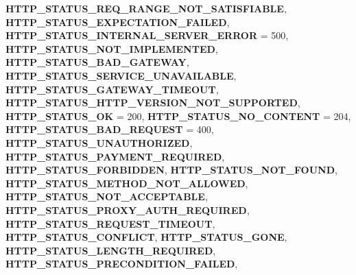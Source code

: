 \begin{DoxyCompactItemize}
\newline
{\bfseries H\+T\+T\+P\+\_\+\+S\+T\+A\+T\+U\+S\+\_\+\+R\+E\+Q\+\_\+\+R\+A\+N\+G\+E\+\_\+\+N\+O\+T\+\_\+\+S\+A\+T\+I\+S\+F\+I\+A\+B\+LE}, 
{\bfseries H\+T\+T\+P\+\_\+\+S\+T\+A\+T\+U\+S\+\_\+\+E\+X\+P\+E\+C\+T\+A\+T\+I\+O\+N\+\_\+\+F\+A\+I\+L\+ED}, 
{\bfseries H\+T\+T\+P\+\_\+\+S\+T\+A\+T\+U\+S\+\_\+\+I\+N\+T\+E\+R\+N\+A\+L\+\_\+\+S\+E\+R\+V\+E\+R\+\_\+\+E\+R\+R\+OR} = 500, 
{\bfseries H\+T\+T\+P\+\_\+\+S\+T\+A\+T\+U\+S\+\_\+\+N\+O\+T\+\_\+\+I\+M\+P\+L\+E\+M\+E\+N\+T\+ED}, 
\newline
{\bfseries H\+T\+T\+P\+\_\+\+S\+T\+A\+T\+U\+S\+\_\+\+B\+A\+D\+\_\+\+G\+A\+T\+E\+W\+AY}, 
{\bfseries H\+T\+T\+P\+\_\+\+S\+T\+A\+T\+U\+S\+\_\+\+S\+E\+R\+V\+I\+C\+E\+\_\+\+U\+N\+A\+V\+A\+I\+L\+A\+B\+LE}, 
{\bfseries H\+T\+T\+P\+\_\+\+S\+T\+A\+T\+U\+S\+\_\+\+G\+A\+T\+E\+W\+A\+Y\+\_\+\+T\+I\+M\+E\+O\+UT}, 
{\bfseries H\+T\+T\+P\+\_\+\+S\+T\+A\+T\+U\+S\+\_\+\+H\+T\+T\+P\+\_\+\+V\+E\+R\+S\+I\+O\+N\+\_\+\+N\+O\+T\+\_\+\+S\+U\+P\+P\+O\+R\+T\+ED}, 
\newline
{\bfseries H\+T\+T\+P\+\_\+\+S\+T\+A\+T\+U\+S\+\_\+\+OK} = 200, 
{\bfseries H\+T\+T\+P\+\_\+\+S\+T\+A\+T\+U\+S\+\_\+\+N\+O\+\_\+\+C\+O\+N\+T\+E\+NT} = 204, 
{\bfseries H\+T\+T\+P\+\_\+\+S\+T\+A\+T\+U\+S\+\_\+\+B\+A\+D\+\_\+\+R\+E\+Q\+U\+E\+ST} = 400, 
{\bfseries H\+T\+T\+P\+\_\+\+S\+T\+A\+T\+U\+S\+\_\+\+U\+N\+A\+U\+T\+H\+O\+R\+I\+Z\+ED}, 
\newline
{\bfseries H\+T\+T\+P\+\_\+\+S\+T\+A\+T\+U\+S\+\_\+\+P\+A\+Y\+M\+E\+N\+T\+\_\+\+R\+E\+Q\+U\+I\+R\+ED}, 
{\bfseries H\+T\+T\+P\+\_\+\+S\+T\+A\+T\+U\+S\+\_\+\+F\+O\+R\+B\+I\+D\+D\+EN}, 
{\bfseries H\+T\+T\+P\+\_\+\+S\+T\+A\+T\+U\+S\+\_\+\+N\+O\+T\+\_\+\+F\+O\+U\+ND}, 
{\bfseries H\+T\+T\+P\+\_\+\+S\+T\+A\+T\+U\+S\+\_\+\+M\+E\+T\+H\+O\+D\+\_\+\+N\+O\+T\+\_\+\+A\+L\+L\+O\+W\+ED}, 
\newline
{\bfseries H\+T\+T\+P\+\_\+\+S\+T\+A\+T\+U\+S\+\_\+\+N\+O\+T\+\_\+\+A\+C\+C\+E\+P\+T\+A\+B\+LE}, 
{\bfseries H\+T\+T\+P\+\_\+\+S\+T\+A\+T\+U\+S\+\_\+\+P\+R\+O\+X\+Y\+\_\+\+A\+U\+T\+H\+\_\+\+R\+E\+Q\+U\+I\+R\+ED}, 
{\bfseries H\+T\+T\+P\+\_\+\+S\+T\+A\+T\+U\+S\+\_\+\+R\+E\+Q\+U\+E\+S\+T\+\_\+\+T\+I\+M\+E\+O\+UT}, 
{\bfseries H\+T\+T\+P\+\_\+\+S\+T\+A\+T\+U\+S\+\_\+\+C\+O\+N\+F\+L\+I\+CT}, 
\newline
{\bfseries H\+T\+T\+P\+\_\+\+S\+T\+A\+T\+U\+S\+\_\+\+G\+O\+NE}, 
{\bfseries H\+T\+T\+P\+\_\+\+S\+T\+A\+T\+U\+S\+\_\+\+L\+E\+N\+G\+T\+H\+\_\+\+R\+E\+Q\+U\+I\+R\+ED}, 
{\bfseries H\+T\+T\+P\+\_\+\+S\+T\+A\+T\+U\+S\+\_\+\+P\+R\+E\+C\+O\+N\+D\+I\+T\+I\+O\+N\+\_\+\+F\+A\+I\+L\+ED}, 

\end{DoxyCompactItemize}
